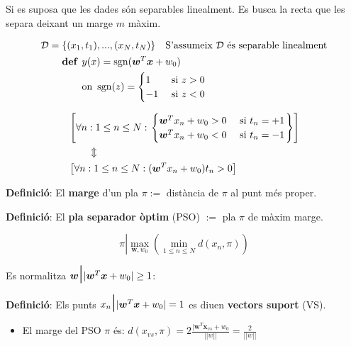 \documentclass[a4paper]{article}
\newcommand*{\op}[1]{\operatorname{#1}}
\newcommand*{\bmath}[1]{\boldsymbol{#1}}
\begin{document}
Si es suposa que les dades són separables linealment. Es busca la recta que les separa deixant un marge $m$ màxim.

\begin{align*}
	\mathcal{D} &= \{ (x_1, t_1), ..., (x_N, t_N) \} \quad \text{S'assumeix $\mathcal{D}$ és separable linealment} \\
	& \phantom{{}={}}  
	\begin{aligned}
		\text{\textbf{def }} & y(x) = \op{sgn}(\boldsymbol{w}^T \boldsymbol{x} + w_0) \\
		& \text{on } \op{sgn}(z) = 
		\begin{cases}
			1 & \text{ si } z > 0 \\
			-1 & \text{ si } z < 0
		\end{cases}
	\end{aligned}
\end{align*}

\begin{align*}
	& \left[ \forall n : 1 \le n \le N : 
	\begin{rcases}
	\begin{cases}
		\bmath{w}^T x_n + w_0 > 0 & \text{ si } t_n = +1 \\
		\bmath{w}^T x_n + w_0 < 0 & \text{ si } t_n = -1
	\end{cases}
	\end{rcases} 
	\right] \\
	& \hspace{2em} \Updownarrow \\
	& \left[ \forall n : 1 \le n \le N : (\bmath{w}^T x_n + w_0) t_n > 0 \right]
\end{align*}

\textbf{Definició}: El \textbf{marge} d'un pla $\pi := $ distància de $\pi$ al punt més proper.

\textbf{Definició}: El \textbf{pla separador òptim} (PSO) $:=$ pla $\pi$ de màxim marge.

$$
\pi \left| \max_{\bmath{w}, w_0} \left( \min_{1 \le n \le N} d(x_n, \pi) \right)\right.
$$

Es normalitza $\bmath{w} \scalebox{1.8}{|} |\bmath{w}^T \bmath{x} + w_0| \ge 1$:

\textbf{Definició}: Els punts $x_n \scalebox{1.8}{|} |\bmath{w}^T \bmath{x} + w_0| = 1$ es diuen \textbf{vectors suport} (VS). 

\begin{itemize}
	\item El marge del PSO $\pi$ és: $d(x_{vs}, \pi) = 2 \frac{|\bmath{w}^T \bmath{x}_{vs} + w_0}{||w||} = \frac{2}{||w||}$
\end{itemize}
\end{document}
